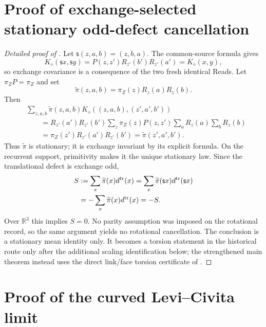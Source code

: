 \documentclass[11pt]{article}
\theoremstyle{definition}
\theoremstyle{remark}
\newcommand{\R}{\mathbb R}
\begin{document}
\section{Proof of exchange-selected stationary odd-defect cancellation}
\label{app:proof-torsion-cancellation}

\begin{proof}[Detailed proof of ]
Let $\mathsf s(z,a,b)=(z,b,a)$.  The common-source formula gives
\[
 K_\diamond(\mathsf sx,\mathsf sy)
 =P(z,z')R_{z'}(b')R_{z'}(a')
 =K_\diamond(x,y),
\]
so exchange covariance is a consequence of the two fresh identical Reads.
Let $\pi_ZP=\pi_Z$ and set
\[
 \widetilde\pi(z,a,b)=\pi_Z(z)R_z(a)R_z(b).
\]
Then
\[
 \begin{aligned}
 &\sum_{z,a,b}\widetilde\pi(z,a,b)
 K_\diamond((z,a,b),(z',a',b'))\\
 &\qquad=R_{z'}(a')R_{z'}(b')
 \sum_z\pi_Z(z)P(z,z')
 \sum_aR_z(a)\sum_bR_z(b)\\
 &\qquad=\pi_Z(z')R_{z'}(a')R_{z'}(b')
 =\widetilde\pi(z',a',b').
 \end{aligned}
\]
Thus $\widetilde\pi$ is stationary; it is exchange invariant by its explicit
formula.  On the recurrent support, primitivity makes it the unique stationary
law.  Since the translational defect is exchange odd,
\[
 \begin{aligned}
 S&:=\sum_x\widetilde\pi(x)d^{\rm tr}(x)
 =\sum_x\widetilde\pi(\mathsf sx)d^{\rm tr}(\mathsf sx)\\
 &=-\sum_x\widetilde\pi(x)d^{\rm tr}(x)=-S.
 \end{aligned}
\]
Over $\R^3$ this implies $S=0$.  No parity assumption was imposed on the
rotational record, so the same argument yields no rotational cancellation.
The conclusion is a stationary mean identity only.  It becomes a torsion
statement in the historical route only after the additional scaling
identification below; the strengthened main theorem instead uses the direct
link/face torsion certificate of .
\end{proof}

\section{Proof of the curved Levi--Civita limit}
\label{app:proof-curved-limit}
\end{document}
